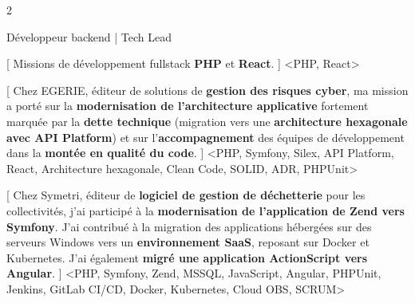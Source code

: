 \begin{paracol}{2}
\begin{leftcolumn}

Développeur backend | Tech Lead

\vspace{12pt}





\vspace{12pt}


[
Missions de développement fullstack \textbf{PHP} et \textbf{React}.
]
<PHP, React>
{}

[
Chez EGERIE, éditeur de solutions de \textbf{gestion des risques cyber}, ma mission a porté sur la
\textbf{modernisation de l'architecture applicative} fortement marquée par la \textbf{dette technique}
(migration vers une \textbf{architecture hexagonale avec API Platform}) et sur l'\textbf{accompagnement}
des équipes de développement dans la \textbf{montée en qualité du code}.
]
<PHP, Symfony, Silex, API Platform, React, Architecture hexagonale, Clean Code, SOLID, ADR, PHPUnit>{}

[
Chez Symetri, éditeur de \textbf{logiciel de gestion de déchetterie} pour les collectivités, j'ai participé
à la \textbf{modernisation de l'application de Zend vers Symfony}. J'ai contribué à la migration
des applications hébergées sur des serveurs Windows vers un \textbf{environnement SaaS}, reposant sur Docker et Kubernetes.
J'ai également \textbf{migré une application ActionScript vers Angular}.
]
<PHP, Symfony, Zend, MSSQL, JavaScript, Angular, PHPUnit, Jenkins, GitLab CI/CD, Docker, Kubernetes, Cloud OBS, SCRUM>
{}


\end{leftcolumn}
\end{paracol}
